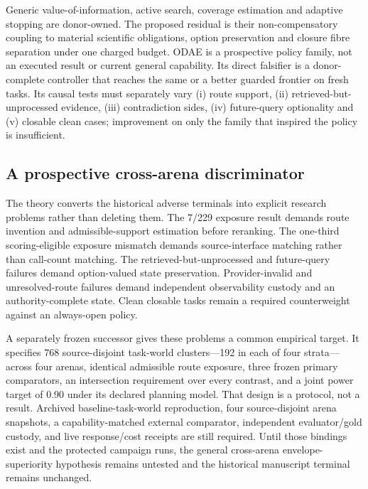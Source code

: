 Generic value-of-information, active search, coverage estimation and adaptive
stopping are donor-owned.  The proposed residual is their non-compensatory
coupling to material scientific obligations, option preservation and closure
fibre separation under one charged budget.  ODAE is a prospective policy family,
not an executed result or current general capability.  Its direct falsifier is a
donor-complete controller that reaches the same or a better guarded frontier on
fresh tasks.  Its causal tests must separately vary (i) route support, (ii)
retrieved-but-unprocessed evidence, (iii) contradiction sides, (iv) future-query
optionality and (v) closable clean cases; improvement on only the family that
inspired the policy is insufficient.

\subsection{A prospective cross-arena discriminator}

The theory converts the historical adverse terminals into explicit research
problems rather than deleting them.  The 7/229 exposure result demands route
invention and admissible-support estimation before reranking.  The one-third
scoring-eligible exposure mismatch demands source-interface matching rather
than call-count matching.  The retrieved-but-unprocessed and future-query
failures demand option-valued state preservation.  Provider-invalid and
unresolved-route failures demand independent observability custody and an
authority-complete state.  Clean closable tasks remain a required counterweight
against an always-open policy.

A separately frozen successor gives these problems a common empirical target.
It specifies 768 source-disjoint task-world clusters---192 in each of four
strata---across four arenas, identical admissible route exposure, three frozen
primary comparators, an intersection requirement over every contrast, and a
joint power target of 0.90 under its declared planning model.  That design is a
protocol, not a result.  Archived baseline-task-world reproduction, four
source-disjoint arena snapshots, a capability-matched external comparator,
independent evaluator/gold custody, and live response/cost receipts are still
required.  Until those bindings exist and the protected campaign runs, the
general cross-arena envelope-superiority hypothesis remains untested and the
historical manuscript terminal remains unchanged.
